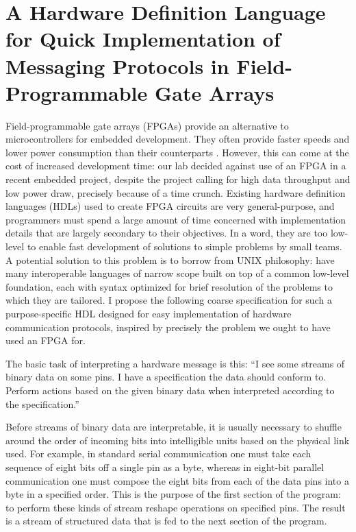 \documentclass[12pt, arial, letterpaper]{article}
\begin{document}
\section*{A Hardware Definition Language for Quick Implementation of Messaging Protocols in Field-Programmable Gate Arrays}
Field-programmable gate arrays (FPGAs) provide an alternative to microcontrollers for embedded development. They often provide faster speeds and lower power consumption than their counterparts \cite{mal}. However, this can come at the cost of increased development time: our lab decided against use of an FPGA in a recent embedded project, despite the project calling for high data throughput and low power draw, precisely because of a time crunch. Existing hardware definition languages (HDLs) used to create FPGA circuits \cite{vlog}\cite{vhdl} are very general-purpose, and programmers must spend a large amount of time concerned with implementation details that are largely secondary to their objectives. In a word, they are too low-level to enable fast development of solutions to simple problems by small teams. A potential solution to this problem is to borrow from UNIX philosophy: have many interoperable languages of narrow scope built on top of a common low-level foundation, each with syntax optimized for brief resolution of the problems to which they are tailored. I propose the following coarse specification for such a purpose-specific HDL designed for easy implementation of hardware communication protocols, inspired by precisely the problem we ought to have used an FPGA for.
\newline

The basic task of interpreting a hardware message is this:
``I see some streams of binary data on some pins.
I have a specification the data should conform to.
Perform actions based on the given binary data when interpreted according to the specification.''
\newline

Before streams of binary data are interpretable, it is usually necessary to shuffle around the order of incoming bits into intelligible units based on the physical link used. For example, in standard serial communication one must take each sequence of eight bits off a single pin as a byte, whereas in eight-bit parallel communication one must compose the eight bits from each of the data pins into a byte in a specified order. This is the purpose of the first section of the program: to perform these kinds of stream reshape operations on specified pins. The result is a stream of structured data that is fed to the next section of the program.
\newline
\end{document}
